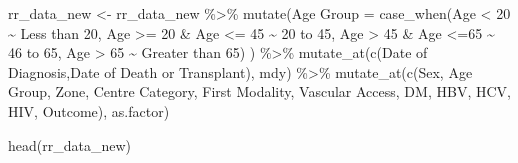\documentclass[
  letterpaper,
  DIV=11,
  numbers=noendperiod]{scrartcl}
\newenvironment{Shaded}{\begin{snugshade}}{\end{snugshade}}
\newcommand{\DecValTok}[1]{\textcolor[rgb]{0.68,0.00,0.00}{#1}}
\newcommand{\FunctionTok}[1]{\textcolor[rgb]{0.28,0.35,0.67}{#1}}
\newcommand{\NormalTok}[1]{\textcolor[rgb]{0.00,0.23,0.31}{#1}}
\newcommand{\OtherTok}[1]{\textcolor[rgb]{0.00,0.23,0.31}{#1}}
\newcommand{\SpecialCharTok}[1]{\textcolor[rgb]{0.37,0.37,0.37}{#1}}
\newcommand{\StringTok}[1]{\textcolor[rgb]{0.13,0.47,0.30}{#1}}
\begin{document}
\begin{Shaded}
\begin{Highlighting}[]
\NormalTok{rr\_data\_new }\OtherTok{\textless{}{-}}\NormalTok{ rr\_data\_new }\SpecialCharTok{\%\textgreater{}\%}
  \FunctionTok{mutate}\NormalTok{(}\StringTok{\textquotesingle{}Age Group\textquotesingle{}} \OtherTok{=} \FunctionTok{case\_when}\NormalTok{(Age }\SpecialCharTok{\textless{}} \DecValTok{20} \SpecialCharTok{\textasciitilde{}} \StringTok{\textquotesingle{}Less than 20\textquotesingle{}}\NormalTok{,}
\NormalTok{                                 Age }\SpecialCharTok{\textgreater{}=} \DecValTok{20} \SpecialCharTok{\&}\NormalTok{ Age }\SpecialCharTok{\textless{}=} \DecValTok{45} \SpecialCharTok{\textasciitilde{}} \StringTok{\textquotesingle{}20 to 45\textquotesingle{}}\NormalTok{,}
\NormalTok{                                 Age }\SpecialCharTok{\textgreater{}} \DecValTok{45} \SpecialCharTok{\&}\NormalTok{ Age }\SpecialCharTok{\textless{}=}\DecValTok{65} \SpecialCharTok{\textasciitilde{}} \StringTok{\textquotesingle{}46 to 65\textquotesingle{}}\NormalTok{,}
\NormalTok{                                 Age }\SpecialCharTok{\textgreater{}} \DecValTok{65} \SpecialCharTok{\textasciitilde{}} \StringTok{\textquotesingle{}Greater than 65\textquotesingle{}}\NormalTok{)}
\NormalTok{         ) }\SpecialCharTok{\%\textgreater{}\%} 
  \FunctionTok{mutate\_at}\NormalTok{(}\FunctionTok{c}\NormalTok{(}\StringTok{\textquotesingle{}Date of Diagnosis\textquotesingle{}}\NormalTok{,}\StringTok{\textquotesingle{}Date of Death or Transplant\textquotesingle{}}\NormalTok{), mdy) }\SpecialCharTok{\%\textgreater{}\%} 
  \FunctionTok{mutate\_at}\NormalTok{(}\FunctionTok{c}\NormalTok{(}\StringTok{\textquotesingle{}Sex\textquotesingle{}}\NormalTok{, }\StringTok{\textquotesingle{}Age Group\textquotesingle{}}\NormalTok{, }\StringTok{\textquotesingle{}Zone\textquotesingle{}}\NormalTok{, }\StringTok{\textquotesingle{}Centre Category\textquotesingle{}}\NormalTok{, }\StringTok{\textquotesingle{}First Modality\textquotesingle{}}\NormalTok{, }\StringTok{\textquotesingle{}Vascular Access\textquotesingle{}}\NormalTok{, }\StringTok{\textquotesingle{}DM\textquotesingle{}}\NormalTok{, }\StringTok{\textquotesingle{}HBV\textquotesingle{}}\NormalTok{, }\StringTok{\textquotesingle{}HCV\textquotesingle{}}\NormalTok{, }\StringTok{\textquotesingle{}HIV\textquotesingle{}}\NormalTok{, }\StringTok{\textquotesingle{}Outcome\textquotesingle{}}\NormalTok{), as.factor)}

\FunctionTok{head}\NormalTok{(rr\_data\_new)}
\end{Highlighting}
\end{Shaded}
\end{document}
